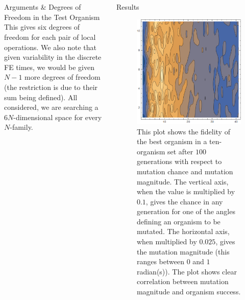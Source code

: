 \documentclass[12pt]{beamer}
\renewcommand{\maketitle}{%
	\begin{center}%
		\Huge\inserttitle\\[5mm]%
		\Large\insertauthor\\[5mm]%
		\Large\insertinstitute%
	\end{center}%
	\vspace*{-1ex}%
}
\begin{document}
\begin{frame}{\maketitle}
\begin{columns}
\begin{column}{.45\textwidth}
\begin{exampleblock}{Arguments \& Degrees of Freedom in the Test Organism}
	This gives six degrees of freedom for each pair of local operations. We also note that given variability in the discrete FE times, we would be given $N-1$ more degrees of freedom (the restriction is due to their sum being defined). All considered,  we are searching a $6N$-dimensional space for every $N$-family.



				\end{exampleblock}
							\end{column}
							
			\begin{column}{.45\textwidth}
				\begin{exampleblock}{Results}
						    \begin{figure}[htpb] 
		\centering
			\includegraphics[scale=2]{efficiency_plot.png}
		\centering
		\caption{This plot shows the fidelity of the best organism in a ten-organism set after $100$ generations with respect to mutation chance and mutation magnitude. The vertical axis, when the value is multiplied by $0.1$, gives the chance in any generation for one of the angles defining an organism to be mutated. The horizontal axis, when multiplied by $0.025$, gives the mutation magnitude (this ranges between $0$ and $1$ radian(s)). The plot shows clear correlation between mutation magnitude and organism success.}
        \label{fig:effplot}
	\end{figure}

				\end{exampleblock}
				\vspace{1em}
							\end{column}
	
		\end{columns}
	\end{frame}
\end{document}
